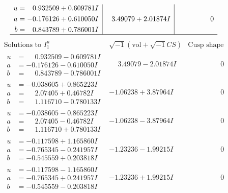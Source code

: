 \documentclass[1p]{elsarticle_modified}
\theoremstyle{definition}
\newcommand{\I}{\sqrt{-1}}
\begin{document}
$$\begin{array}{c|c|c}
\begin{aligned}
u &= \phantom{-}0.932509 + 0.609781 I \\
a &= -0.176126 + 0.610050 I \\
b &= \phantom{-}0.843789 + 0.786001 I\end{aligned}
 & \phantom{-}3.49079 + 2.01874 I & \phantom{-0.000000 } 0\\
 \hline 
 \end{array}$$\newpage$$\begin{array}{c|c|c}  
\text{Solutions to }I^u_{1}& \I (\text{vol} + \sqrt{-1}CS) & \text{Cusp shape}\\
 \hline 
\begin{aligned}
u &= \phantom{-}0.932509 - 0.609781 I \\
a &= -0.176126 - 0.610050 I \\
b &= \phantom{-}0.843789 - 0.786001 I\end{aligned}
 & \phantom{-}3.49079 - 2.01874 I & \phantom{-0.000000 } 0 \\ \hline\begin{aligned}
u &= -0.038605 + 0.865223 I \\
a &= \phantom{-}2.07405 + 0.46782 I \\
b &= \phantom{-}1.116710 - 0.780133 I\end{aligned}
 & -1.06238 + 3.87964 I & \phantom{-0.000000 } 0 \\ \hline\begin{aligned}
u &= -0.038605 - 0.865223 I \\
a &= \phantom{-}2.07405 - 0.46782 I \\
b &= \phantom{-}1.116710 + 0.780133 I\end{aligned}
 & -1.06238 - 3.87964 I & \phantom{-0.000000 } 0 \\ \hline\begin{aligned}
u &= -0.117598 + 1.165860 I \\
a &= -0.765345 - 0.241957 I \\
b &= -0.545559 + 0.203818 I\end{aligned}
 & -1.23236 - 1.99215 I & \phantom{-0.000000 } 0 \\ \hline\begin{aligned}
u &= -0.117598 - 1.165860 I \\
a &= -0.765345 + 0.241957 I \\
b &= -0.545559 - 0.203818 I\end{aligned}
 & -1.23236 + 1.99215 I & \phantom{-0.000000 } 0 \\ \hline\begin{aligned}

\end{aligned}
\end{array}$$
\end{document}
